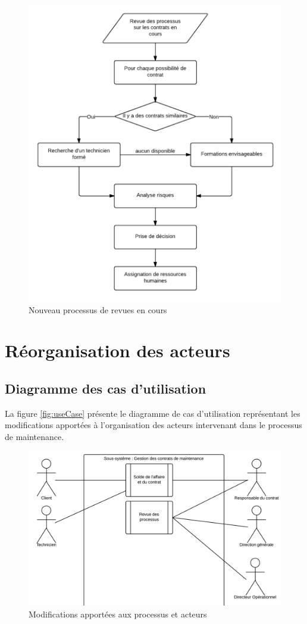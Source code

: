 \begin{figure}[h!]
	\centering
	\includegraphics[width=0.45\linewidth]{images/processus_revues_actuels.png}
	\caption{Nouveau processus de revues en cours}
	\label{fig:processusRevueCours}
\end{figure}


\section{Réorganisation des acteurs}

\subsection{Diagramme des cas d'utilisation}

La figure \vref{fig:useCase} présente le diagramme de cas d'utilisation représentant les modifications apportées à l'organisation des acteurs intervenant dans le processus de maintenance.

\begin{figure}[h!]
	\centering
	\includegraphics[width=1\linewidth]{images/useCase.png}
	\caption{Modifications apportées aux processus et acteurs}
	\label{fig:useCase}
\end{figure}

